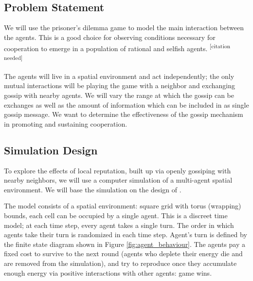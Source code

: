 \documentclass[english]{article}
\newcommand{\citationneeded}{\textsuperscript{\color{blue} [citation needed]}}
\begin{document}
\subsection{Problem Statement}
We will use the prisoner's dilemma game to model the main interaction between the agents.
This is a good choice for observing conditions necessary for cooperation to emerge in a population of rational and selfish agents.
\citationneeded

The agents will live in a spatial environment and act independently;
the only mutual interactions will be playing the game with a neighbor and exchanging gossip with nearby agents.
We will vary the range at which the gossip can be exchanges as well as the amount of information which can be included in as single gossip message.
We want to determine the effectiveness of the gossip mechanism in promoting and sustaining cooperation.

\subsection{Simulation Design}

To explore the effects of local reputation, built up via openly gossiping with nearby neighbors,
we will use a computer simulation of a multi-agent spatial environment.
We will base the simulation on the design of \citet{smaldino}.

The model consists of a spatial environment:
square grid with torus (wrapping) bounds,
each cell can be occupied by a single agent.
This is a discreet time model;
at each time step, every agent takes a single turn.
The order in which agents take their turn is randomized in each time step.
Agent's turn is defined by the finite state diagram shown in Figure \ref{fig:agent_behaviour}.
The agents pay a fixed cost to survive to the next round (agents who deplete their energy die and are removed from the simulation), and try to reproduce once they accumulate enough energy via positive interactions with other agents: game wins.
\end{document}
